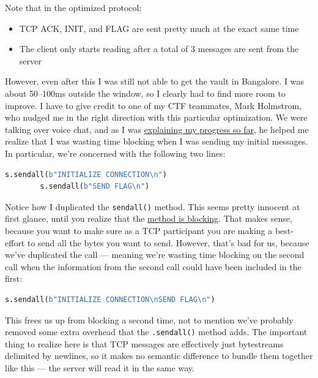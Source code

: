 \documentclass[11pt]{article}
\begin{document}
    \noindent Note that in the optimized protocol:
    \begin{itemize}
        \item TCP ACK, INIT, and FLAG are sent pretty much at the exact same time
        \item The client only starts reading after a total of 3 messages are sent from the server
    \end{itemize}

    However, even after this I was still not able to get the vault in Bangalore. I was about 50--100ms outside the window, so I clearly had to find more room to improve. I have to give credit to one of my CTF teammates, Mark Holmstrom, who nudged me in the right direction with this particular optimization. We were talking over voice chat, and as I was \href{https://en.wikipedia.org/wiki/Rubber_duck_debugging}{explaining my progress so far}, he helped me realize that I was wasting time blocking when I was sending my initial messages. In particular, we're concerned with the following two lines:

    \begin{lstlisting}[gobble=8,label={lst:second-efficiency-1},language=Python]
        s.sendall(b"INITIALIZE CONNECTION\n")
        s.sendall(b"SEND FLAG\n")
    \end{lstlisting}

    Notice how I duplicated the \verb`sendall()` method. This seems pretty innocent at first glance, until you realize that the \href{https://docs.python.org/3/library/socket.html#socket.socket.sendall}{method is blocking}. That makes sense, because you want to make sure as a TCP participant you are making a best-effort to send all the bytes you want to send. However, that's bad for us, because we've duplicated the call --- meaning we're wasting time blocking on the second call when the information from the second call could have been included in the first:

    \begin{lstlisting}[gobble=8,label={lst:second-efficiency-2},language=Python]
        s.sendall(b"INITIALIZE CONNECTION\nSEND FLAG\n")
    \end{lstlisting}

    This frees us up from blocking a second time, not to mention we've probably removed some extra overhead that the \verb`.sendall()` method adds. The important thing to realize here is that TCP messages are effectively just bytestreams delimited by newlines, so it makes no semantic difference to bundle them together like this --- the server will read it in the same way.
\end{document}
